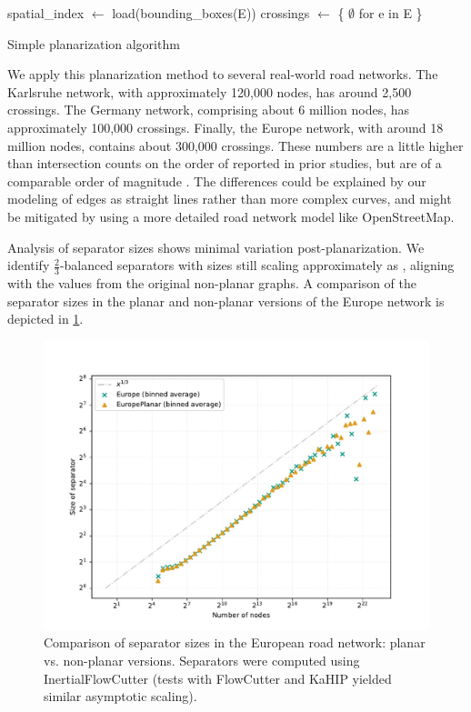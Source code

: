 \begin{algorithm}[tbhp]
    \BlankLine
    spatial\_index \(\longleftarrow\) load(bounding\_boxes(E))\;
    crossings \(\longleftarrow\) \{ \(\emptyset\) for e in E \}\;
    \caption{Simple planarization algorithm \label{alg:planarization}}
\end{algorithm}

We apply this planarization method to several real-world road networks.
The Karlsruhe network, with approximately 120,000 nodes, has around 2,500 crossings.
The Germany network, comprising about 6 million nodes, has approximately 100,000 crossings.
Finally, the Europe network, with around 18 million nodes, contains about 300,000 crossings.
These numbers are a little higher than intersection counts on the order of  reported in prior studies, but are of a comparable order of magnitude \cite{eppstein_studying_2008}.
The differences could be explained by our modeling of edges as straight lines rather than more complex curves, and might be mitigated by using a more detailed road network model like OpenStreetMap.

Analysis of separator sizes shows minimal variation post-planarization.
We identify \(\frac{2}{3}\)-balanced separators with sizes still scaling approximately as , aligning with the values from the original non-planar graphs.
A comparison of the separator sizes in the planar and non-planar versions of the Europe network is depicted in \cref{fig:germany_planar_vs_non_planar}.

\begin{figure}[tbhp]
    \centering
    \includegraphics[width=0.6\linewidth]{graphics/EuropePlanarVsNonPlanar.pdf}
    \caption{Comparison of separator sizes in the European road network: planar vs. non-planar versions. Separators were computed using InertialFlowCutter (tests with FlowCutter and KaHIP yielded similar asymptotic scaling).}
    \label{fig:germany_planar_vs_non_planar}
\end{figure}

